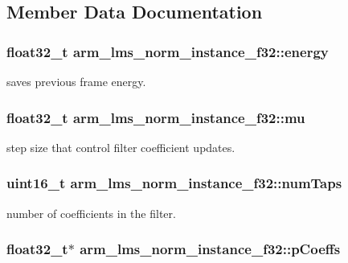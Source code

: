 \subsection{Member Data Documentation}
\hypertarget{structarm__lms__norm__instance__f32_a6a4119e4f39447bbee31b066deafa16f}{
\subsubsection[{energy}]{\setlength{\rightskip}{0pt plus 5cm}float32\-\_\-t arm\-\_\-lms\-\_\-norm\-\_\-instance\-\_\-f32\-::energy}}\label{structarm__lms__norm__instance__f32_a6a4119e4f39447bbee31b066deafa16f}
saves previous frame energy. \hypertarget{structarm__lms__norm__instance__f32_a84401d3cfc6c40f69c08223cf341b886}{
\subsubsection[{mu}]{\setlength{\rightskip}{0pt plus 5cm}float32\-\_\-t arm\-\_\-lms\-\_\-norm\-\_\-instance\-\_\-f32\-::mu}}\label{structarm__lms__norm__instance__f32_a84401d3cfc6c40f69c08223cf341b886}
step size that control filter coefficient updates. \hypertarget{structarm__lms__norm__instance__f32_ac95f8ca3d816524c2070643852fac5e8}{
\subsubsection[{num\-Taps}]{\setlength{\rightskip}{0pt plus 5cm}uint16\-\_\-t arm\-\_\-lms\-\_\-norm\-\_\-instance\-\_\-f32\-::num\-Taps}}\label{structarm__lms__norm__instance__f32_ac95f8ca3d816524c2070643852fac5e8}
number of coefficients in the filter. \hypertarget{structarm__lms__norm__instance__f32_a1ba688d90aba7de003ed4ad8e2e7ddda}{
\subsubsection[{p\-Coeffs}]{\setlength{\rightskip}{0pt plus 5cm}float32\-\_\-t$\ast$ arm\-\_\-lms\-\_\-norm\-\_\-instance\-\_\-f32\-::p\-Coeffs}}\label{structarm__lms__norm__instance__f32_a1ba688d90aba7de003ed4ad8e2e7ddda}

